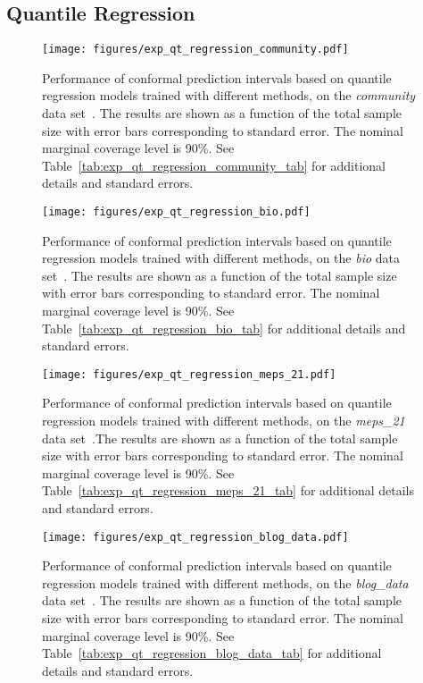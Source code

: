 \FloatBarrier
\subsection{Quantile Regression}


\begin{figure}[!htb]
    \centering
    \texttt{[image: figures/exp\_qt\_regression\_community.pdf]}
    \caption{Performance of conformal prediction intervals based on quantile regression models trained with different methods, on the {\em community} data set~\cite{community}. The results are shown as a function of the total sample size with error bars corresponding to standard error. The nominal marginal coverage level is 90\%. See Table~\ref{tab:exp_qt_regression_community_tab} for additional details and standard errors.}
    \label{fig:exp_qt_regression_community}
\end{figure}

\begin{figure}[!htb]
    \centering
    \texttt{[image: figures/exp\_qt\_regression\_bio.pdf]}
    \caption{Performance of conformal prediction intervals based on quantile regression models trained with different methods, on the {\em bio} data set~\cite{data-bio}. The results are shown as a function of the total sample size with error bars corresponding to standard error. The nominal marginal coverage level is 90\%. See Table~\ref{tab:exp_qt_regression_bio_tab} for additional details and standard errors.}
    \label{fig:exp_qt_regression_bio}
\end{figure}

\begin{figure}[!htb]
    \centering
    \texttt{[image: figures/exp\_qt\_regression\_meps\_21.pdf]}
    \caption{Performance of conformal prediction intervals based on quantile regression models trained with different methods, on the {\em meps\_21} data set~\cite{meps_21}.The results are shown as a function of the total sample size with error bars corresponding to standard error. The nominal marginal coverage level is 90\%. See Table~\ref{tab:exp_qt_regression_meps_21_tab} for additional details and standard errors.}
    \label{fig:exp_qt_regression_meps_21}
\end{figure}

\begin{figure}[!htb]
    \centering
    \texttt{[image: figures/exp\_qt\_regression\_blog\_data.pdf]}
    \caption{Performance of conformal prediction intervals based on quantile regression models trained with different methods, on the {\em blog\_data} data set~\cite{blog_data}. The results are shown as a function of the total sample size with error bars corresponding to standard error. The nominal marginal coverage level is 90\%. See Table~\ref{tab:exp_qt_regression_blog_data_tab} for additional details and standard errors.}
    \label{fig:exp_qt_regression_blog_data}
\end{figure}

